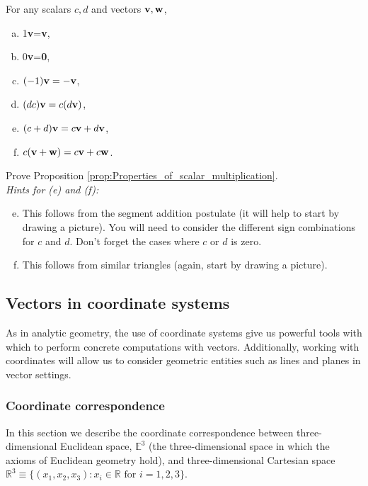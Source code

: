 \documentclass[12pt,letterpaper,reqno]{article}
\numberwithin{equation}{section}
\newcommand{\ti}[1]{\textit{#1}}
\begin{document}
\begin{prop}\label{prop:Properties_of_scalar_multiplication}
For any scalars $c,d$ and vectors ${\bf v}, {\bf w}$,
	\begin{enumerate}[(a)]
		\item 1{\bf v}={\bf v},
		\item 0{\bf v}={\bf 0},
		\item $(-1){\bf v}=-{\bf v}$,
		\item $(dc){\bf v}=c(d{\bf v})$,
		\item $(c+d){\bf v}=c{\bf v}+d{\bf v}$,
		\item $c({\bf v}+{\bf w})=c{\bf v}+c{\bf w}$.
	\end{enumerate}
\end{prop}

\begin{exercise}
Prove Proposition \ref{prop:Properties_of_scalar_multiplication}. \\
\ti{Hints for (e) and (f):}
\begin{enumerate}[(a)]
\setcounter{enumi}{4}
	\item This follows from the segment addition postulate (it will help to start by drawing a picture). You will need to consider the different sign combinations for $c$ and $d$. Don't forget the cases where $c$ or $d$ is zero.
	\item This follows from similar triangles (again, start by drawing a picture).
\end{enumerate}
\end{exercise}


\subsection{Vectors in coordinate systems}
As in analytic geometry, the use of coordinate systems give us powerful tools with which to perform concrete computations with vectors. Additionally, working with coordinates will allow us to consider geometric entities such as lines and planes in vector settings. 

\subsubsection{Coordinate correspondence}
In this section we describe the coordinate correspondence between three-dimensional Euclidean space, $\mathbb{E}^3$ (the three-dimensional space in which the axioms of Euclidean geometry hold), and three-dimensional Cartesian space $\mathbb{R}^3\equiv \{(x_1,x_2,x_3):x_i \in \mathbb{R} \text{ for } i=1,2,3\}$.
\end{document}
